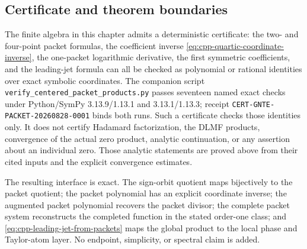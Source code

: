 \subsection{Certificate and theorem boundaries}

The finite algebra in this chapter admits a deterministic certificate:
the two- and four-point packet formulas, the coefficient inverse
\eqref{eq:cpp-quartic-coordinate-inverse}, the one-packet logarithmic
derivative, the first symmetric coefficients, and the leading-jet formula can
all be checked as polynomial or rational identities over exact symbolic
coordinates.  The companion script
\texttt{verify\_centered\_packet\_products.py} passes seventeen named exact
checks under Python/SymPy 3.13.9/1.13.1 and 3.13.1/1.13.3; receipt
\texttt{CERT-GNTE-PACKET-20260828-0001} binds both runs.  Such a certificate
checks those identities only.  It does not
certify Hadamard factorization, the DLMF products, convergence of the actual
zero product, analytic continuation, or any assertion about an individual
zero.  Those analytic statements are proved above from their cited inputs and
the explicit convergence estimates.

The resulting interface is exact.  The sign-orbit quotient maps bijectively to
the packet quotient; the packet polynomial has an explicit coordinate inverse;
the augmented packet polynomial recovers the packet divisor; the complete
packet system reconstructs the completed function in the stated order-one
class; and \eqref{eq:cpp-leading-jet-from-packets} maps the global product to
the local phase and Taylor-atom layer.  No endpoint, simplicity, or spectral
claim is added.
